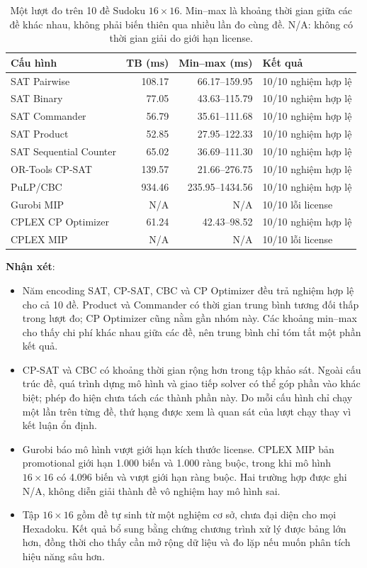 \documentclass[a4paper,fleqn,nologo]{cas-sc}
\begin{document}
\begin{table}[pos=!htbp]
\centering
\small
\caption{Một lượt đo trên 10 đề Sudoku $16\times16$. Min--max là khoảng thời gian giữa các đề khác nhau, không phải biến thiên qua nhiều lần đo cùng đề. N/A: không có thời gian giải do giới hạn license.}
\label{tab:large_solvers}
\begin{tabular}{@{}lrrl@{}}
\toprule
\textbf{Cấu hình} & \textbf{TB (ms)} & \textbf{Min--max (ms)} & \textbf{Kết quả} \\
\midrule
SAT Pairwise & 108.17 & 66.17--159.95 & 10/10 nghiệm hợp lệ \\
SAT Binary & 77.05 & 43.63--115.79 & 10/10 nghiệm hợp lệ \\
SAT Commander & 56.79 & 35.61--111.68 & 10/10 nghiệm hợp lệ \\
SAT Product & 52.85 & 27.95--122.33 & 10/10 nghiệm hợp lệ \\
SAT Sequential Counter & 65.02 & 36.69--111.30 & 10/10 nghiệm hợp lệ \\
OR-Tools CP-SAT & 139.57 & 21.66--276.75 & 10/10 nghiệm hợp lệ \\
PuLP/CBC & 934.46 & 235.95--1434.56 & 10/10 nghiệm hợp lệ \\
Gurobi MIP & N/A & N/A & 10/10 lỗi license \\
CPLEX CP Optimizer & 61.24 & 42.43--98.52 & 10/10 nghiệm hợp lệ \\
CPLEX MIP & N/A & N/A & 10/10 lỗi license \\
\bottomrule
\end{tabular}
\end{table}

\textbf{Nhận xét}:
\begin{itemize}
    \item Năm encoding SAT, CP-SAT, CBC và CP Optimizer đều trả nghiệm hợp lệ cho cả 10 đề. Product và Commander có thời gian trung bình tương đối thấp trong lượt đo; CP Optimizer cũng nằm gần nhóm này. Các khoảng min--max cho thấy chi phí khác nhau giữa các đề, nên trung bình chỉ tóm tắt một phần kết quả.
    \item CP-SAT và CBC có khoảng thời gian rộng hơn trong tập khảo sát. Ngoài cấu trúc đề, quá trình dựng mô hình và giao tiếp solver có thể góp phần vào khác biệt; phép đo hiện chưa tách các thành phần này. Do mỗi cấu hình chỉ chạy một lần trên từng đề, thứ hạng được xem là quan sát của lượt chạy thay vì kết luận ổn định.
    \item Gurobi báo mô hình vượt giới hạn kích thước license. CPLEX MIP bản promotional giới hạn 1.000 biến và 1.000 ràng buộc, trong khi mô hình $16\times16$ có 4.096 biến và vượt giới hạn ràng buộc. Hai trường hợp được ghi N/A, không diễn giải thành đề vô nghiệm hay mô hình sai.
    \item Tập $16\times16$ gồm đề tự sinh từ một nghiệm cơ sở, chưa đại diện cho mọi Hexadoku. Kết quả bổ sung bằng chứng chương trình xử lý được bảng lớn hơn, đồng thời cho thấy cần mở rộng dữ liệu và đo lặp nếu muốn phân tích hiệu năng sâu hơn.
\end{itemize}
\end{document}

